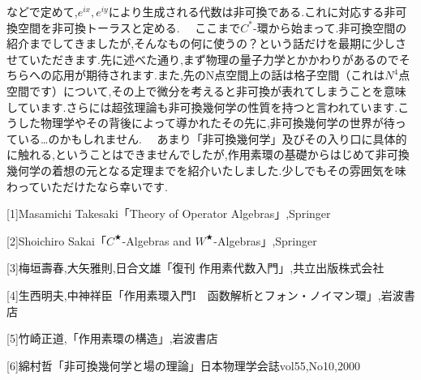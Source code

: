 などで定めて,$e^{ix},e^{iy}$により生成される代数は非可換である.これに対応する非可換空間を非可換トーラスと定める.
　ここまで$C^*$-環から始まって.非可換空間の紹介までしてきましたが,そんなもの何に使うの？という話だけを最期に少しさせていただきます.先に述べた通り,まず物理の量子力学とかかわりがあるのでそちらへの応用が期待されます.また,先のN点空間上の話は格子空間（これは$N^4$点空間です）について,その上で微分を考えると非可換が表れてしまうことを意味しています.さらには超弦理論も非可換幾何学の性質を持つと言われています.こうした物理学やその背後によって導かれたその先に,非可換幾何学の世界が待っている…のかもしれません.
　あまり「非可換幾何学」及びその入り口に具体的に触れる,ということはできませんでしたが,作用素環の基礎からはじめて非可換幾何学の着想の元となる定理までを紹介いたしました.少しでもその雰囲気を味わっていただけたなら幸いです.

\begin{description}
\item{[1]}Masamichi Takesaki「Theory of Operator Algebras」,Springer
\item{[2]}Shoichiro Sakai「$C^★$-Algebras and $W^★$-Algebras」,Springer
\item{[3]}梅垣壽春,大矢雅則,日合文雄「復刊 作用素代数入門」,共立出版株式会社
\item{[4]}生西明夫,中神祥臣「作用素環入門I　函数解析とフォン・ノイマン環」,岩波書店
\item{[5]}竹崎正道,「作用素環の構造」,岩波書店
\item{[6]}綿村哲「非可換幾何学と場の理論」日本物理学会誌vol55,No10,2000
\end{description}
